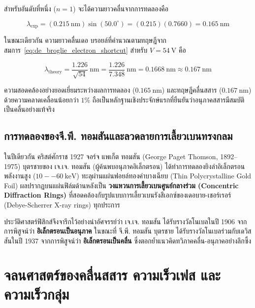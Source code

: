 สำหรับอันดับที่หนึ่ง ($n = 1$) จะได้ความยาวคลื่นจากการทดลองคือ

\begin{equation}
\lambda_{\text{exp}} = (0.215~\text{nm})\sin(50.0^\circ) = (0.215)(0.7660) = 0.165~\text{nm}
\end{equation}

ในขณะเดียวกัน ความยาวคลื่นเดอ บรอยล์ที่คำนวณตามทฤษฎีจากสมการ~\eqref{eq:de_broglie_electron_shortcut} สำหรับ $V = 54~\text{V}$ คือ

\begin{equation}
\lambda_{\text{theory}} = \frac{1.226}{\sqrt{54}}~\text{nm} = \frac{1.226}{7.348}~\text{nm} = 0.1668~\text{nm} \approx 0.167~\text{nm}
\end{equation}

ความสอดคล้องอย่างยอดเยี่ยมระหว่างผลการทดลอง ($0.165~\text{nm}$) และทฤษฎีคลื่นสสาร ($0.167~\text{nm}$) ด้วยความคลาดเคลื่อนน้อยกว่า $1\%$ ถือเป็นหลักฐานเชิงประจักษ์แรกที่ยืนยันว่าอนุภาคสสารมีสมบัติเป็นคลื่นอย่างแท้จริง

\subsection{การทดลองของจี.พี. ทอมสันและลวดลายการเลี้ยวเบนทรงกลม}

ในปีเดียวกัน คริสต์ศักราช 1927 จอร์จ แพเก็ต ทอมสัน (George Paget Thomson, 1892--1975) บุตรชายของ เจ.เจ. ทอมสัน (ผู้ค้นพบอนุภาคอิเล็กตรอน) ได้ทำการทดลองยิงลำอิเล็กตรอนพลังงานสูง ($10--60~\text{keV}$) ทะลุผ่านแผ่นฟอยล์ทองคำบางเฉียบ (Thin Polycrystalline Gold Foil) ผลปรากฏบนแผ่นฟิล์มด้านหลังเป็น \textbf{วงแหวนการเลี้ยวเบนศูนย์กลางร่วม (Concentric Diffraction Rings)} ที่สอดคล้องกับรูปแบบการเลี้ยวเบนรังสีเอกซ์ของเดอบาย-เชอร์เรอร์ (Debye-Scherrer X-ray rings) ทุกประการ

ประวัติศาสตร์ฟิสิกส์จึงจารึกไว้อย่างน่าอัศจรรย์ว่า เจ.เจ. ทอมสัน ได้รับรางวัลโนเบลในปี 1906 จากการพิสูจน์ว่า \textbf{อิเล็กตรอนเป็นอนุภาค} ในขณะที่ จี.พี. ทอมสัน บุตรชาย ได้รับรางวัลโนเบลร่วมกับเดวิสสันในปี 1937 จากการพิสูจน์ว่า \textbf{อิเล็กตรอนเป็นคลื่น} ซึ่งตอกย้ำแนวคิดทวิภาคคลื่น-อนุภาคอย่างลึกซึ้ง

\section{จลนศาสตร์ของคลื่นสสาร ความเร็วเฟส และความเร็วกลุ่ม}

